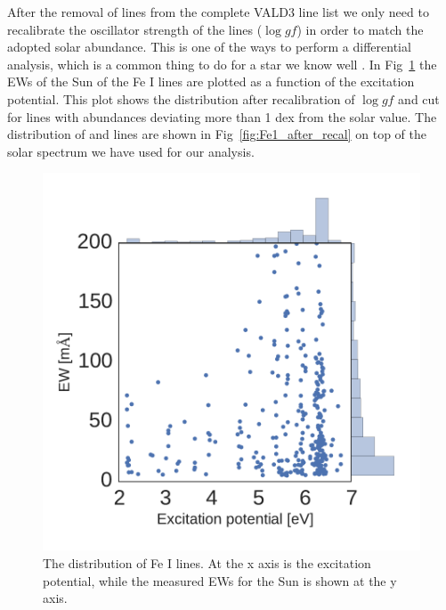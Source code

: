\documentclass{aa}
\begin{document}
After the removal of lines from the complete VALD3 line list we only
need to recalibrate the oscillator strength of the lines ($\log
\mathit{gf}$) in order to match the adopted solar abundance. This is
one of the ways to perform a differential analysis, which is a common
thing to do for a star we know well \citep{Sousa2008a,Onehag2012}.
In Fig~\ref{fig:Fe1_before_recal} the EWs of the Sun of the Fe I
lines are plotted as a function of the excitation potential. This
plot shows the distribution after recalibration of $\log gf$ and
cut for lines with abundances deviating more than 1 dex from the
solar value. The distribution of  and  lines are shown in
Fig~\ref{fig:Fe1_after_recal} on top of the solar spectrum we have used
for our analysis.


\begin{figure}[tpb]
    \centering
    \includegraphics[width=1.0\linewidth]{figures/EWvsEP.pdf}
    \caption{The distribution of Fe I lines. At the x axis is
    the excitation potential, while the measured EWs for the Sun is
    shown at the y axis.}
    \label{fig:Fe1_before_recal}
\end{figure}
\end{document}
